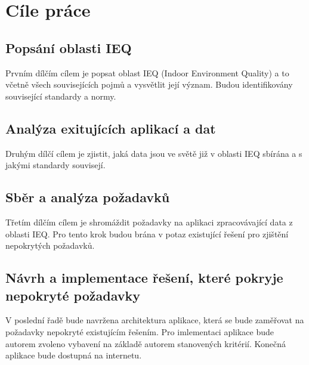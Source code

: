 \section*{Cíle práce}


\FloatBarrier
\subsection*{Popsání oblasti IEQ}
Prvním dílčím cílem je popsat oblast IEQ (Indoor Environment Quality) a to včetně všech souvisejících pojmů a vysvětlit její význam. Budou identifikovány související standardy a normy.

\FloatBarrier
\subsection*{Analýza exitujících aplikací a dat}
Druhým dílčí cílem je zjistit, jaká data jsou ve světě již v oblasti IEQ sbírána a s jakými standardy souvisejí.


\FloatBarrier
\subsection*{Sběr a analýza požadavků}
Třetím dílčím cílem je shromáždit požadavky na aplikaci zpracovávající data z oblasti IEQ. Pro tento krok budou brána v potaz existující řešení pro zjištění nepokrytých požadavků.

\FloatBarrier
\subsection*{ Návrh a implementace řešení, které pokryje nepokryté požadavky}
V poslední řadě bude navržena architektura aplikace, která se bude zaměřovat na požadavky nepokryté existujícím řešením. Pro imlementaci aplikace bude autorem zvoleno vybavení na základě autorem stanovených kritérií. Konečná aplikace bude dostupná na internetu.

